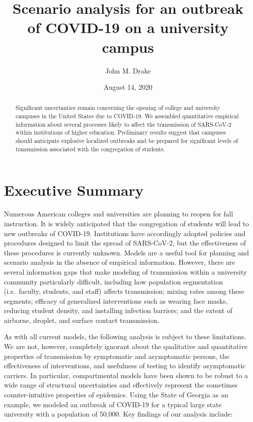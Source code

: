 \documentclass[
]{article}
\title{Scenario analysis for an outbreak of COVID-19 on a university
campus}
\author{John M. Drake}
\date{August 14, 2020}
\begin{document}
\maketitle
\begin{abstract}
Significant uncertanties remain concerning the opening of college and
university campuses in the United States due to COVID-19. We assembled
quantitative empirical information about several processes likely to
affect the transmission of SARS-CoV-2 within institutions of higher
education. Preliminary results suggest that campuses should anticipate
explosive localized outbreaks and be prepared for significant levels of
transmission associated with the congregation of students.
\end{abstract}

\hypertarget{executive-summary}{%
\section{Executive Summary}\label{executive-summary}}

Numerous American colleges and universities are planning to reopen for
fall instruction. It is widely anticipated that the congregation of
students will lead to new outbreaks of COVID-19. Institutions have
accordingly adopted policies and procedures designed to limit the spread
of SARS-CoV-2, but the effectiveness of these procedures is currently
unknown. Models are a useful tool for planning and scenario analysis in
the absence of empirical information. However, there are several
information gaps that make modeling of transmission within a university
community particularly difficult, including how population segmentation
(i.e.~faculty, students, and staff) affects transmission; mixing rates
among these segments; efficacy of generalized interventions such as
wearing face masks, reducing student density, and installing infection
barriers; and the extent of airborne, droplet, and surface contact
transmission.

As with all current models, the following analysis is subject to these
limitations. We are not, however, completely ignorant about the
qualitative and quantitative properties of transmission by symptomatic
and asymptomatic persons, the effectiveness of interventions, and
usefulness of testing to identify asymptomatic carriers. In particular,
compartmental models have been shown to be robust to a wide range of
structural uncertainties and effectively represent the sometimes
counter-intuitive properties of epidemics. Using the State of Georgia as
an example, we modeled an outbreak of COVID-19 for a typical large state
university with a population of 50,000. Key findings of our analysis
include:
\end{document}
